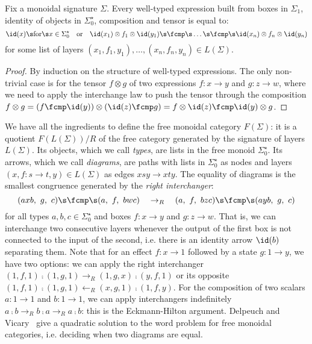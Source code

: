 \begin{lemma}
Fix a monoidal signature $\Sigma$.
Every well-typed expression built from boxes in $\Sigma_1$, identity of objects in $\Sigma_0^\star$, composition and tensor is equal to:
$$
\id(x) \s \text{for} \s x \in \Sigma_0^\star \quad \text{or} \quad
\id(x_1) \otimes f_1 \otimes \id(y_1)
\s \fcmp \s \dots \s \fcmp \s
\id(x_n) \otimes f_n \otimes \id(y_n)$$
for some list of layers $(x_1, f_1, y_1), \dots, (x_n, f_n, y_n) \in L(\Sigma)$.
\end{lemma}

\begin{proof}
By induction on the structure of well-typed expressions.
The only non-trivial case is for the tensor $f \otimes g$ of two expressions $f : x \to y$ and $g : z \to w$, where we need to apply the interchange law to push the tensor through the composition $f \otimes g = (f \fcmp \id(y)) \otimes (\id(z) \fcmp g) = f \otimes \id(z) \fcmp \id(y) \otimes g$.
\end{proof}

We have all the ingredients to define the free monoidal category $F(\Sigma)$: it is a quotient $F(L(\Sigma)) / R$ of the free category generated by the signature of layers $L(\Sigma)$.
Its objects, which we call \emph{types}, are lists in the free monoid $\Sigma_0^\star$.
Its arrows, which we call \emph{diagrams}, are paths with lists in $\Sigma_0^\star$ as nodes and layers $(x, f : s \to t, y) \in L(\Sigma)$ as edges $x s y \to x t y$.
The equality of diagrams is the smallest congruence generated by the \emph{right interchanger}:
$$
(a x b, \ g, \ c) \s \fcmp \s (a, \ f, \ b w c)
\quad \to_R \quad
(a, \ f, \ b z c) \s \fcmp \s (a y b, \ g, \ c)
$$
for all types $a, b, c \in \Sigma_0^\star$ and boxes $f : x \to y$ and $g : z \to w$.
That is, we can interchange two consecutive layers whenever the output of the first box is not connected to the input of the second, i.e. there is an identity arrow $\id(b)$ separating them.
Note that for an effect $f : x \to 1$ followed by a state $g : 1 \to y$, we have two options: we can apply the right interchanger $(1, f, 1) \fcmp (1, g, 1) \to_R (1, g, x) \fcmp (y, f, 1)$ or its opposite $(1, f, 1) \fcmp (1, g, 1) \leftarrow_R (x, g, 1) \fcmp (1, f, y)$.
For the composition of two scalars $a : 1 \to 1$ and $b : 1 \to 1$, we can apply interchangers indefinitely $a \fcmp b \to_R b \fcmp a \to_R a \fcmp b$: this is the Eckmann-Hilton argument.
Delpeuch and Vicary~\cite{DelpeuchVicary18} give a quadratic solution to the word problem for free monoidal categories, i.e. deciding when two diagrams are equal.

